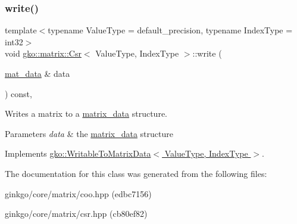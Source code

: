 \subsubsection{\texorpdfstring{write()}{write()}}
{\footnotesize\ttfamily template$<$typename Value\+Type = default\+\_\+precision, typename Index\+Type = int32$>$ \\
void \hyperlink{classgko_1_1matrix_1_1Csr}{gko\+::matrix\+::\+Csr}$<$ Value\+Type, Index\+Type $>$\+::write (\begin{DoxyParamCaption}\item[{\hyperlink{structgko_1_1matrix__data}{mat\+\_\+data} \&}]{data }\end{DoxyParamCaption}) const\hspace{0.3cm}{\ttfamily [override]}, {\ttfamily [virtual]}}



Writes a matrix to a \hyperlink{structgko_1_1matrix__data}{matrix\+\_\+data} structure. 


\begin{DoxyParams}{Parameters}
{\em data} & the \hyperlink{structgko_1_1matrix__data}{matrix\+\_\+data} structure \\
\hline
\end{DoxyParams}


Implements \hyperlink{classgko_1_1WritableToMatrixData_a96036c3a4bf4c67fa93002808b8b14e2}{gko\+::\+Writable\+To\+Matrix\+Data$<$ Value\+Type, Index\+Type $>$}.



The documentation for this class was generated from the following files\+:\begin{DoxyCompactItemize}
\item 
ginkgo/core/matrix/coo.\+hpp (edbc7156)\item 
ginkgo/core/matrix/csr.\+hpp (cb80ef82)\end{DoxyCompactItemize}
